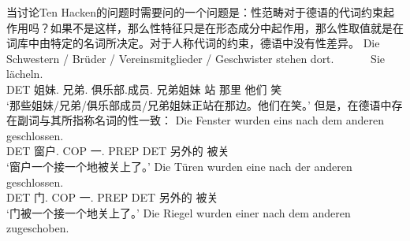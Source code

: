 当讨论Ten Hacken的问题时需要问的一个问题是：性范畴对于德语的代词约束起作用吗？如果不是这样，那么性特征只是在形态成分中起作用，那么性取值就是在词库中由特定的名词所决定。对于人称代词的约束，德语中没有性差异。
\ea
\gll Die Schwestern / Brüder / Vereinsmitglieder / Geschwister stehen dort.~~~~~~ Sie lächeln.\\
     DET 姐妹.\fem{} {} 兄弟.\mas{} {} 俱乐部.成员.\neu{} {} 兄弟姐妹 站 那里 他们 笑\\
\glt `那些姐妹/兄弟/俱乐部成员/兄弟姐妹正站在那边。他们在笑。'
\z
但是，在德语中存在副词与其所指称名词的性一致\citep[\S~6]{Hoehle83}：
\eal
\label{Beispiel-einer-nach-dem-anderen}
\ex
\gll Die Fenster wurden eins nach dem anderen geschlossen.\\
	 DET 窗户.\neu{}  COP 一.\neu{} PREP DET 另外的 被关\\
\glt `窗户一个接一个地被关上了。'
\ex 
\gll Die Türen wurden eine nach der anderen geschlossen.\\
	DET 门.\fem{} COP 一.\fem{} PREP DET 另外的 被关\\
\glt `门被一个接一个地关上了。'
\ex 
\gll Die Riegel wurden einer nach dem anderen zugeschoben.\\

